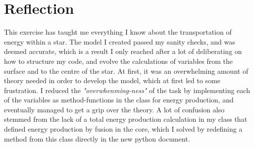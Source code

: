 \documentclass[10pt, nofootinbib, twocolumn]{revtex4-1}
\begin{document}
\section{Reflection}
This exercise has taught me everything I know about the transportation of energy within a star. The model I created passed my sanity checks, and was deemed accurate, which is a result I only reached after a lot of deliberating on how to structure my code, and evolve the calculations of variables from the surface and to the centre of the star. At first, it was an overwhelming amount of theory needed in order to develop the model, which at first led to some frustration. I reduced the \textit{"overwhenming-ness"} of the task by implementing each of the variables as method-functions in the class for energy production, and eventually managed to get a grip over the theory. A lot of confusion also stemmed from the lack of a total energy production calculation in my class that defined energy production by fusion in the core, which I solved by redefining a method from this class directly in the new python document.




\cleardoublepage
\end{document}
